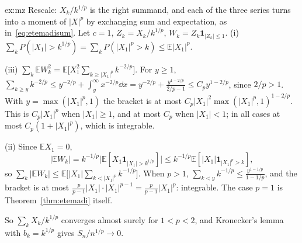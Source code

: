 \begin{solution}{ex:mz}
\idea Rescale: $X_k/k^{1/p}$ is the right summand, and each of the three series turns into a moment of $|X|^p$ by exchanging sum and expectation, as
in~\eqref{eq:etemadisum}.
\writeup Let $c=1$, $Z_k=X_k/k^{1/p}$, $W_k=Z_k\mathbf 1_{|Z_k|\le1}$. (i) $\sum_kP(|X_1|>k^{1/p})=\sum_kP(|X_1|^p>k)\le\mathbb E|X_1|^p$.

(iii) $\sum_k\mathbb E W_k^2=\mathbb E\bigl[X_1^2\sum_{k\ge|X_1|^p}k^{-2/p}\bigr]$. For $y\ge1$, $\sum_{k\ge y}k^{-2/p}\le y^{-2/p}+\int_y^\infty x^{-2/p}\dd x=
y^{-2/p}+\frac{y^{1-2/p}}{2/p-1}\le C_py^{1-2/p}$, since $2/p>1$. With $y=\max(|X_1|^p,1)$ the bracket is at most $C_p|X_1|^2\max(|X_1|^p,1)^{1-2/p}$.
This is $C_p|X_1|^p$ when $|X_1|\ge1$, and at most $C_p$ when $|X_1|<1$; in all cases at most $C_p(1+|X_1|^p)$, which is integrable.

(ii) Since $\mathbb E X_1=0$,
\[
|\mathbb E W_k|=k^{-1/p}\bigl|\mathbb E[X_1\mathbf 1_{|X_1|>k^{1/p}}]\bigr|\le k^{-1/p}\mathbb E[|X_1|\mathbf 1_{|X_1|^p>k}],
\]
so $\sum_k|\mathbb E W_k|\le\mathbb E\bigl[|X_1|\sum_{k<|X_1|^p}k^{-1/p}\bigr]$. When $p>1$, $\sum_{k<y}k^{-1/p}\le\frac{y^{1-1/p}}{1-1/p}$, and the bracket is at most
$\frac p{p-1}|X_1|\cdot|X_1|^{p-1}=\frac p{p-1}|X_1|^p$: integrable. The case $p=1$ is Theorem~\ref{thm:etemadi} itself.

So $\sum_kX_k/k^{1/p}$ converges almost surely for $1<p<2$, and Kronecker's lemma with $b_k=k^{1/p}$ gives $S_n/n^{1/p}\to0$.
\end{solution}


